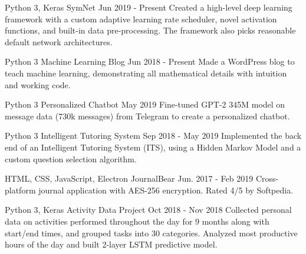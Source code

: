 

\begin{cventries}

  \cventry
    {Python 3, Keras} %
    {SymNet} %
    {} %
    {Jun 2019 - Present} %
    {
      Created a high-level deep learning framework with a custom adaptive learning rate scheduler, novel activation functions, and built-in data pre-processing. The framework also picks reasonable default network architectures.
    }

  \cventry
    {Python 3} %
    {Machine Learning Blog} %
    {} %
    {Jun 2018 - Present} %
    {
      Made a WordPress blog to teach machine learning, demonstrating all mathematical details with intuition and working code.
    }
    
  \cventry
    {Python 3} %
    {Personalized Chatbot} %
    {} %
    {May 2019} %
    {
      Fine-tuned GPT-2 345M model on message data (730k messages) from Telegram to create a personalized chatbot.
    }

  \cventry
    {Python 3} %
    {Intelligent Tutoring System} %
    {} %
    {Sep 2018 - May 2019} %
    {
      Implemented the back end of an Intelligent Tutoring System (ITS), using a Hidden Markov Model and a custom question selection algorithm.
    }

  \cventry
    {HTML, CSS, JavaScript, Electron} %
    {JournalBear} %
    {} %
    {Jun. 2017 - Feb 2019} %
    {
      Cross-platform journal application with AES-256 encryption. Rated 4/5 by Softpedia.
    }

  \cventry
    {Python 3, Keras} %
    {Activity Data Project} %
    {} %
    {Oct 2018 - Nov 2018} %
    {
      Collected personal data on activities performed throughout the day for 9 months along with start/end times, and grouped tasks into 30 categories. Analyzed most productive hours of the day and built 2-layer LSTM predictive model.
    }


\end{cventries}
